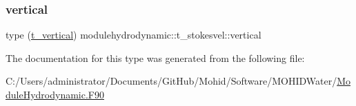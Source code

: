 \mbox{\label{structmodulehydrodynamic_1_1t__stokesvel_a91dc4e35e7efe9179743bf03a1427122}} 
\subsubsection{\texorpdfstring{vertical}{vertical}}
{\footnotesize\ttfamily type (\mbox{\hyperlink{structmodulehydrodynamic_1_1t__vertical}{t\+\_\+vertical}}) modulehydrodynamic\+::t\+\_\+stokesvel\+::vertical\hspace{0.3cm}{\ttfamily [private]}}



The documentation for this type was generated from the following file\+:\begin{DoxyCompactItemize}
\item 
C\+:/\+Users/administrator/\+Documents/\+Git\+Hub/\+Mohid/\+Software/\+M\+O\+H\+I\+D\+Water/\mbox{\hyperlink{_module_hydrodynamic_8_f90}{Module\+Hydrodynamic.\+F90}}\end{DoxyCompactItemize}
